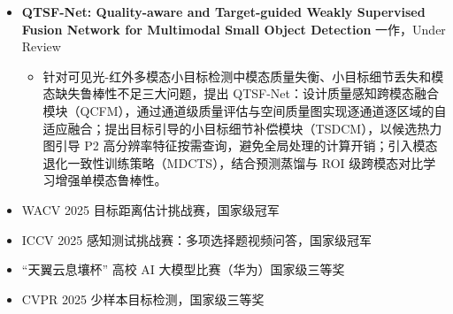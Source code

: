 \documentclass[zh]{resume}
\begin{document}
\begin{itemize}
  \item \textbf{QTSF-Net: Quality-aware and Target-guided Weakly Supervised Fusion Network for Multimodal Small Object Detection} \hfill 一作，Under Review
  \begin{itemize}
    \item 针对可见光-红外多模态小目标检测中模态质量失衡、小目标细节丢失和模态缺失鲁棒性不足三大问题，提出 QTSF-Net：设计质量感知跨模态融合模块（QCFM），通过通道级质量评估与空间质量图实现逐通道逐区域的自适应融合；提出目标引导的小目标细节补偿模块（TSDCM），以候选热力图引导 P2 高分辨率特征按需查询，避免全局处理的计算开销；引入模态退化一致性训练策略（MDCTS），结合预测蒸馏与 ROI 级跨模态对比学习增强单模态鲁棒性。
  \end{itemize}
\end{itemize}

\begin{itemize}
  \item WACV 2025 目标距离估计挑战赛，国家级冠军
  \item ICCV 2025 感知测试挑战赛：多项选择题视频问答，国家级冠军
  \item ``天翼云息壤杯'' 高校 AI 大模型比赛（华为）国家级三等奖
  \item CVPR 2025 少样本目标检测，国家级三等奖
\end{itemize}
\end{document}
